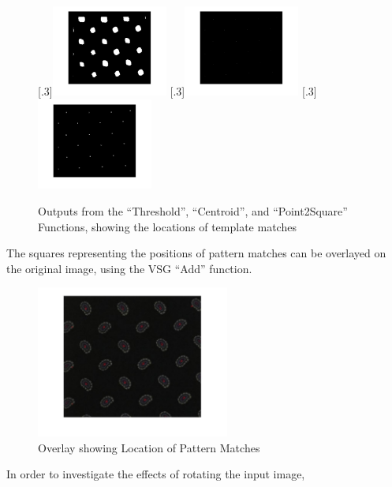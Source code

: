 \documentclass[a4paper]{article}
\begin{document}
	\begin{figure}[H]
		\centering
		[.3\linewidth]{\includegraphics[height=3cm]{Results/Q3/a/qaThresh.jpg}}%
		[.3\linewidth]{\includegraphics[height=3cm]{Results/Q3/a/qaCentroid.jpg}}%
		[.3\linewidth]{\includegraphics[height=3cm]{Results/Q3/a/qaP2S.jpg}}%
		\caption{Outputs from the ``Threshold'', ``Centroid'', and
		``Point2Square'' Functions, showing the locations of template
	matches}
		\label{fig:}
	\end{figure}
	\par The squares representing the positions of pattern matches can be
	overlayed on the original image, using the VSG ``Add'' function.
	\begin{figure}[H]
		\centering
		\includegraphics[height=5cm]{Results/Q3/a/qaOverlay.jpg}%
		\caption{Overlay showing Location of Pattern Matches}
		\label{fig:}
	\end{figure}
	\par In order to investigate the effects of rotating the input image,
\end{document}
